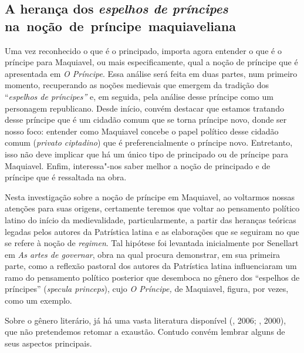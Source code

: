 \subsection{A herança dos \emph{espelhos de príncipes} na~noção~de~príncipe~maquiaveliana}

Uma vez reconhecido o que é o principado, importa agora entender o que é
o príncipe para Maquiavel, ou mais especificamente, qual a noção de
príncipe que é apresentada em \emph{O Príncipe}. Essa análise será feita
em duas partes, num primeiro momento, recuperando as noções medievais
que emergem da tradição dos ``\emph{espelhos de príncipes''} e, em
seguida, pela análise desse príncipe como um personagem republicano.
Desde início, convém destacar que estamos tratando desse príncipe que é
um cidadão comum que se torna príncipe novo, donde ser nosso foco:
entender como Maquiavel concebe o papel político desse cidadão comum
(\emph{privato ciptadino}) que é preferencialmente o príncipe novo.
Entretanto, isso não deve implicar que há um único tipo de principado ou
de príncipe para Maquiavel. Enfim, interessa"-nos saber melhor a noção de
principado e de príncipe que é ressaltada na obra.

Nesta investigação sobre a noção de príncipe em Maquiavel, ao voltarmos
nossas atenções para suas origens, certamente teremos que voltar ao
pensamento político latino do início da medievalidade, particularmente,
a partir das heranças teóricas legadas pelos autores da Patrística
latina e as elaborações que se seguiram no que se refere à noção de
\emph{regimen}. Tal hipótese foi levantada inicialmente por Senellart em
\emph{As artes de governar}, obra na qual procura demonstrar, em sua
primeira parte, como a reflexão pastoral dos autores da Patrística
latina influenciaram um ramo do pensamento político posterior que
desemboca no gênero dos ``espelhos de príncipes'' (\emph{specula
princeps}), cujo \emph{O Príncipe,} de Maquiavel, figura, por vezes,
como um exemplo.

Sobre o gênero literário, já há uma vasta literatura disponível
(, 2006; , 2000), que não pretendemos retomar a
exaustão. Contudo convém lembrar alguns de seus aspectos principais.

